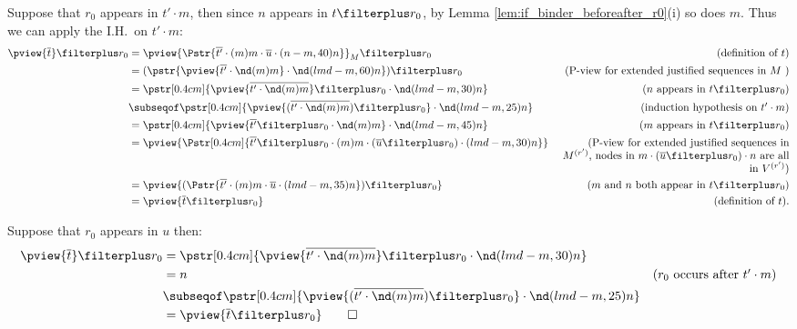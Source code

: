 \begin{itemize}
     Suppose that $r_0$ appears in $t' \cdot m$, then since $n$ appears in $t\filterplus r_0$, by Lemma \ref{lem:if_binder_beforeafter_r0}(i) so does $m$. Thus we can apply the I.H.\ on $t' \cdot m$:
     \begin{align*}
        \pview{\overline{t}} \filterplus r_0
        &= \pview{\Pstr{\overline{t'} \cdot (m){m} \cdot \overline{u} \cdot (n-m,40){n}}}_M \filterplus r_0
                & (\mbox{definition of } t)\\
        &= (\pstr{\pview{\overline{t'} \cdot \nd(m){m}}  \cdot \nd(lmd-m,60){n}}) \filterplus r_0
                & (\mbox{P-view for extended justified sequences in $M$ }) \\
        &= \pstr[0.4cm]{ \pview{\overline{t' \cdot \nd(m){m}}} \filterplus r_0  \cdot  \nd(lmd-m,30){n} }
                & (\mbox{$n$ appears in $t \filterplus r_0$}) \\
        &\subseqof \pstr[0.4cm]{ \pview{(\overline{t' \cdot \nd(m){m}} )\filterplus r_0} \cdot \nd(lmd-m,25){n} }
                & \mbox{(induction hypothesis on $t' \cdot m$)} \\
        &= \pstr[0.4cm]{ \pview{\overline{t'}\filterplus r_0 \cdot \nd(m){m}} \cdot \nd(lmd-m,45){n} }
                & \mbox{($m$ appears in $t \filterplus r_0$)} \\
        &= \pview{ \Pstr[0.4cm]{\overline{t'} \filterplus r_0 \cdot (m){m} \cdot {(\overline{u} \filterplus r_0)} \cdot (lmd-m,30){n}}}
                & \parbox[t]{7.5cm}{\raggedleft(P-view for extended justified sequences in $M^{(r')}$, nodes in $m\cdot (\overline{u} \filterplus r_0) \cdot n$ are all in $V^{(r')}$)} \\
        &= \pview{ (\Pstr{\overline{t'} \cdot (m){m} \cdot \overline{u} \cdot (lmd-m,35){n}}) \filterplus r_0 }
                & \mbox{($m$ and $n$ both appear in } t \filterplus r_0) \\
        &= \pview{ \overline{t} \filterplus r_0 }
                & \mbox{(definition of $t$).}
      \end{align*}

      Suppose that $r_0$ appears in $u$ then:
      \begin{align*}
        \pview{\overline{t}} \filterplus r_0
        &= \pstr[0.4cm]{ \pview{\overline{t' \cdot \nd(m){m}}}
           \filterplus r_0  \cdot  \nd(lmd-m,30){n} } \\
        &= n & (\mbox{$r_0$ occurs after $t'\cdot m$}) \\
            &\subseqof \pstr[0.4cm]{ \pview{(\overline{t' \cdot \nd(m){m}} )\filterplus r_0} \cdot \nd(lmd-m,25){n} }
                \\
        &= \pview{ \overline{t} \filterplus r_0 } \qed
      \end{align*}
\end{itemize}


